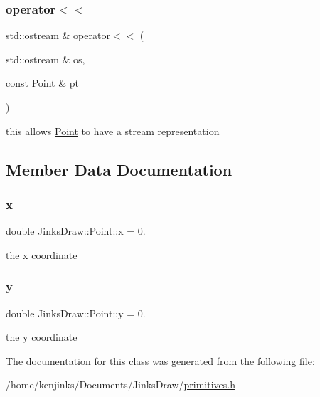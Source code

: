 \subsubsection{\texorpdfstring{operator$<$$<$}{operator<<}}
{\footnotesize\ttfamily std\+::ostream \& operator$<$$<$ (\begin{DoxyParamCaption}\item[{std\+::ostream \&}]{os,  }\item[{const \mbox{\hyperlink{class_jinks_draw_1_1_point}{Point}} \&}]{pt }\end{DoxyParamCaption})\hspace{0.3cm}{\ttfamily [friend]}}



this allows \mbox{\hyperlink{class_jinks_draw_1_1_point}{Point}} to have a stream representation 


\begin{DoxyCode}{0}
\end{DoxyCode}
 

\subsection{Member Data Documentation}
\mbox{\label{class_jinks_draw_1_1_point_a49a46c3d78c0c68260d55dacdee458de}} 
\subsubsection{\texorpdfstring{x}{x}}
{\footnotesize\ttfamily double Jinks\+Draw\+::\+Point\+::x = 0.\hspace{0.3cm}{\ttfamily [private]}}



the x coordinate 

\mbox{\label{class_jinks_draw_1_1_point_ad2dbfbd07baf41cfe82737a4f347bab5}} 
\subsubsection{\texorpdfstring{y}{y}}
{\footnotesize\ttfamily double Jinks\+Draw\+::\+Point\+::y = 0.\hspace{0.3cm}{\ttfamily [private]}}



the y coordinate 



The documentation for this class was generated from the following file\+:\begin{DoxyCompactItemize}
\item 
/home/kenjinks/\+Documents/\+Jinks\+Draw/\mbox{\hyperlink{primitives_8h}{primitives.\+h}}\end{DoxyCompactItemize}
